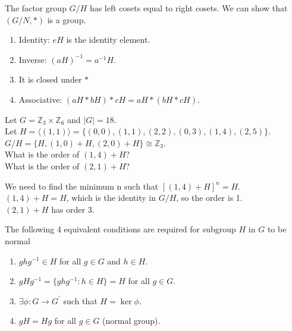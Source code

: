 
\begin{eg}
    The factor group $G/H$ has left cosets equal to right cosets. We can show that $(G/N, \ast)$ is a group.\\
    \begin{enumerate}
        \item Identity: $eH$ is the identity element.
        \item Inverse: $(aH)^{-1} = a^{-1}H$.
        \item It is closed under $\ast$
        \item Associative: $(aH \ast bH) \ast cH = aH \ast (bH \ast cH)$.
    \end{enumerate}
\end{eg}

\begin{eg}
    Let $G = \mathbb{Z}_3 \times \mathbb{Z}_6$ and $|G| = 18$.\\
    Let $H = \langle (1, 1) \rangle = \{(0, 0), (1, 1), (2, 2), (0, 3), (1, 4), (2, 5)\}$.\\
    $G/H = \{H, (1, 0) + H, (2, 0) + H\} \cong \mathbb{Z}_3$.\\
    What is the order of $(1, 4) + H$?\\
    What is the order of $(2, 1) + H$?\\
\end{eg}
\begin{answer}
    We need to find the minimum n such that $[(1, 4) + H]^n = H$.\\
    $(1, 4) + H = H$, which is the identity in $G/H$, so the order is 1.\\
    $(2, 1) + H$ has order 3.\\
\end{answer}

\begin{theorem}
    The following 4 equivalent conditions are required for subgroup $H$ in $G$ to be normal
    \begin{enumerate}
        \item $ghg^{-1} \in H$ for all $g \in G$ and $h \in H$. 
        \item $gHg^{-1} = \{ghg^{-1} : h \in H\} = H$ for all $g \in G$.
        \item $\exists \phi: G \to G^{\prime}$ such that $H = \ker \phi$.
        \item $gH = Hg$ for all $g \in G$ (normal group).
    \end{enumerate}
\end{theorem}

